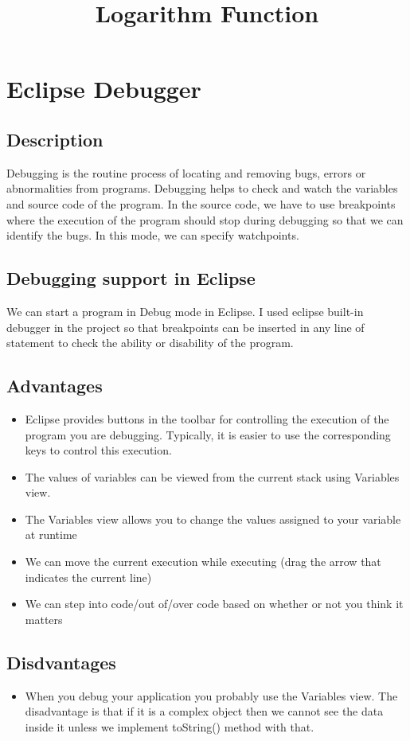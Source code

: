 \documentclass{article}
\title{\textbf {Logarithm Function}}
\begin{document}
\maketitle

\section{Eclipse Debugger}
\subsection{Description}

Debugging is the routine process of locating and removing bugs, errors or abnormalities from programs. Debugging helps to check and watch the variables and source code of the program. In the source code, we have to use breakpoints where the execution of the program should stop during debugging so that we can identify the bugs. In this mode, we can specify watchpoints.


\subsection{Debugging support in Eclipse}
We can start a program in Debug mode in Eclipse. I used eclipse built-in debugger in the project so that breakpoints can be inserted in any line of statement to check the ability or disability of the program.
\subsection{Advantages}
\begin{itemize}
\item Eclipse provides buttons in the toolbar for controlling the execution of the program you are debugging. Typically, it is easier to use the corresponding keys to control this execution.
\item The values of variables can be viewed from the current stack using Variables view.
\item The Variables view allows you to change the values assigned to your variable at runtime
\item We can move the current execution while executing (drag the arrow that indicates the current line)
\item We can step into code/out of/over code based on whether or not you think it matters
\end{itemize}

\subsection{Disdvantages}
\begin{itemize}

\item When you debug your application you probably use the Variables view. The disadvantage is that if it is a complex object then we cannot see the data inside it unless we implement toString() method with that.
\end{itemize}
\end{document}
